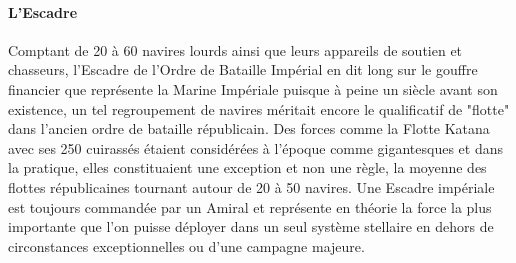 \documentclass[twoside]{article}
\begin{document}
\paragraph{L'Escadre}
Comptant de 20 à 60 navires lourds ainsi que leurs appareils de soutien et chasseurs, l'Escadre de l'Ordre de Bataille Impérial en dit long sur le gouffre financier que représente la Marine Impériale puisque à peine un siècle avant son existence, un tel regroupement de navires méritait encore le qualificatif de "flotte" dans l'ancien ordre de bataille républicain. Des forces comme la Flotte Katana avec ses 250 cuirassés étaient considérées à l'époque comme gigantesques et dans la pratique, elles constituaient une exception et non une règle, la moyenne des flottes républicaines tournant autour de 20 à 50 navires. Une Escadre impériale est toujours commandée par un Amiral et représente en théorie la force la plus importante que l'on puisse déployer dans un seul système stellaire en dehors de circonstances exceptionnelles ou d'une campagne majeure.
\end{document}
